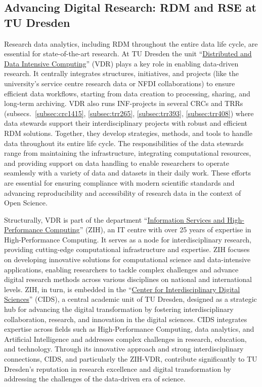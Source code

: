 \documentclass{eceasst}
\begin{document}
\subsection{Advancing Digital Research: RDM and RSE at TU Dresden}
\label{subsec:vdr}
Research data analytics, including RDM throughout the entire data life cycle, are essential for state-of-the-art research.
At TU Dresden the unit ``\href{https://tu-dresden.de/zih/forschung/datenintensives_rechnen}{Distributed and Data Intensive Computing}'' (VDR) plays a key role in enabling data-driven research.
It centrally integrates structures, initiatives, and projects (like the university’s service centre research data or NFDI collaborations)
to ensure efficient data workflows, starting from data creation to processing, sharing, and long-term archiving.
VDR also runs INF-projects in several CRCs and TRRs (subsecs.~\ref{subsec:crc1415}, \ref{subsec:trr265}, \ref{subsec:trr393}, \ref{subsec:trr408}) where data stewards support their interdisciplinary projects with robust and
efficient RDM solutions.
Together, they develop strategies, methods, and tools to handle data throughout its entire life cycle.
The responsibilities of the data stewards range from maintaining the infrastructure, integrating computational resources,
and providing support on data handling to enable researchers to operate seamlessly with a variety of data and datasets in their daily work.
These efforts are essential for ensuring compliance with modern scientific standards and advancing reproducibility and accessibility
of research data in the context of Open Science.

Structurally, VDR is part of the department ``\href{https://tu-dresden.de/zih}{Information Services and High-Performance Computing}'' (ZIH), an IT centre with over 25 years of expertise in High-Performance Computing.
It serves as a node for interdisciplinary research, providing cutting-edge computational infrastructure and expertise.
ZIH focuses on developing innovative solutions for computational science and data-intensive applications,
enabling researchers to tackle complex challenges and advance digital research methods across various disciplines on national and international levels.
ZIH, in turn, is embedded in the ``\href{https://tu-dresden.de/cids}{Center for Interdisciplinary Digital Sciences}'' (CIDS), a central academic unit of TU Dresden, designed as a
strategic hub for advancing the digital transformation by fostering interdisciplinary collaboration, research, and innovation in the digital sciences.
CIDS integrates expertise across fields such as High-Performance Computing, data analytics, and Artificial Intelligence and addresses complex challenges in research, education, and technology.
Through its innovative approach and strong interdisciplinary connections, CIDS, and particularly the ZIH-VDR, contribute significantly
to TU Dresden’s reputation in research excellence and digital transformation by addressing the challenges of the data-driven era of science.
\end{document}
